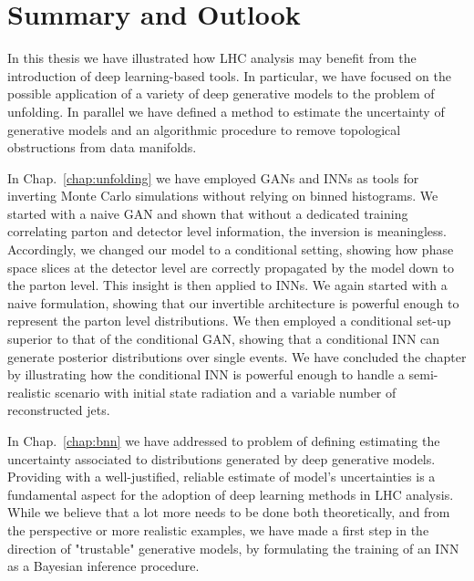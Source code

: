 %
%
%

\chapter{Summary and Outlook}\label{chap:summ}
\enlargethispage{2ex}
\vspace*{-2pt}

In this thesis we have illustrated how LHC analysis may benefit from the introduction of deep learning-based tools.
In particular, we have focused on the possible application of a variety of deep generative models to the problem of unfolding. In parallel we have defined a method to estimate the uncertainty of generative models and an algorithmic procedure to remove topological obstructions from data manifolds.

\medskip
In Chap.~\ref{chap:unfolding} we have employed GANs and INNs as tools for inverting Monte Carlo simulations without relying on binned histograms. We started with a naive GAN and shown that without a dedicated training correlating parton and detector level information, the inversion is meaningless. Accordingly, we changed our model to a conditional setting, showing how phase space slices at the detector level are correctly propagated by the model down to the parton level. This insight is then applied to INNs. We again started with a naive formulation, showing that our invertible architecture is powerful enough to represent the parton level distributions. We then employed a conditional set-up superior to that of the conditional GAN, showing that a conditional INN can generate posterior distributions over single events. We have concluded the chapter by illustrating how the conditional INN is powerful enough to handle a semi-realistic scenario with initial state radiation and a variable number of reconstructed jets.

\medskip

In Chap.~\ref{chap:bnn} we have addressed to problem of defining estimating the uncertainty associated to distributions generated by deep generative models. Providing with a well-justified, reliable estimate of model's uncertainties is a fundamental aspect for the adoption of deep learning methods in LHC analysis. While we believe that a lot more needs to be done both theoretically, and from the perspective or more realistic examples, we have made a first step in the direction of "trustable" generative models, by formulating the training of an INN as a Bayesian inference procedure.

